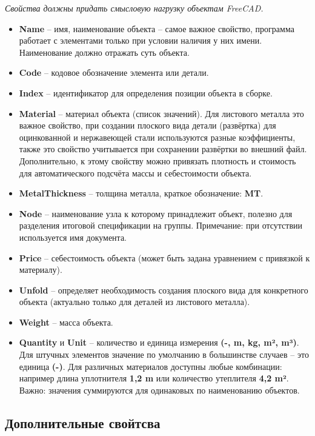 \documentclass[a4paper,12pt]{article}
\begin{document}
\begin{center}\emph{Свойства должны придать смысловую нагрузку объектам FreeCAD.}\end{center}

\begin{itemize}
	\item \textbf{Name} -- имя, наименование объекта -- самое важное свойство, программа работает с элементами только при условии наличия у них имени. Наименование должно отражать суть объекта.
	\item \textbf{Code} -- кодовое обозначение элемента или детали.
	\item \textbf{Index} -- идентификатор для определения позиции объекта в сборке.
	\item \textbf{Material} -- материал объекта (список значений). Для листового металла это важное свойство, при создании плоского вида детали (развёртка) для оцинкованной и нержавеющей стали используются разные коэффициенты, также это свойство учитывается при сохранении развёртки во внешний файл. Дополнительно, к этому свойству можно привязать плотность и стоимость для автоматического подсчёта массы и себестоимости объекта.
	\item \textbf{MetalThickness} -- толщина металла, краткое обозначение: \textbf{MT}.
	\item \textbf{Node} -- наименование узла к которому принадлежит объект, полезно для разделения итоговой спецификации на группы. Примечание: при отсутствии используется имя документа.
	\item \textbf{Price} -- себестоимость объекта (может быть задана уравнением с привязкой к материалу).
	\item \textbf{Unfold} -- определяет необходимость создания плоского вида для конкретного объекта (актуально только для деталей из листового металла).
	\item \textbf{Weight} -- масса объекта.
	\item \textbf{Quantity} и \textbf{Unit} -- количество и единица измерения \textbf{(-, m, kg, m², m³)}. Для штучных элементов значение по умолчанию в большинстве случаев -- это единица \textbf{(-)}. Для различных материалов доступны любые комбинации: например длина уплотнителя \textbf{1,2 m} или количество утеплителя \textbf{4,2 m²}. Важно: значения суммируются для одинаковых по наименованию объектов.
\end{itemize}


\subsection{Дополнительные свойтсва}
\end{document}
